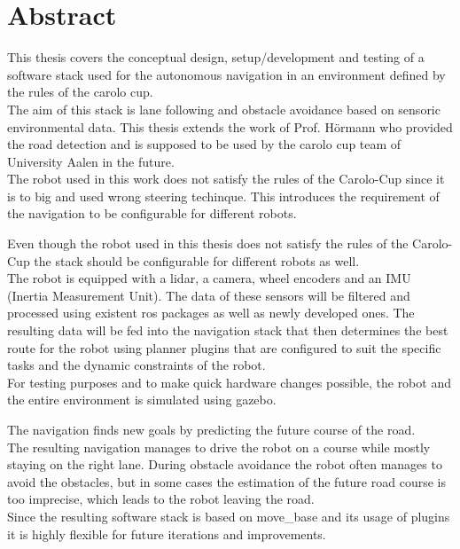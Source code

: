 \chapter*{Abstract}
\label{abstract}
This thesis covers the conceptual design, setup/development and testing of a software stack used for the autonomous navigation in an environment defined by the rules of the carolo cup.\\

 The aim of this stack is lane following and obstacle avoidance based on sensoric environmental data. This thesis extends the work of Prof. Hörmann who provided the road detection and is supposed to be used by the carolo cup team of University Aalen in the future.\\
 The robot used in this work does not satisfy the rules of the Carolo-Cup since it is to big and used wrong steering techinque. This introduces the requirement of the navigation to be configurable for different robots.
 
 Even though the robot used in this thesis does not satisfy the rules of the Carolo-Cup the stack should be configurable for different robots as well.\\
The robot is equipped with a lidar, a camera, wheel encoders and an IMU (Inertia Measurement Unit). The data of these sensors will be filtered and processed using existent ros packages as well as newly developed ones. The resulting data will be fed into the navigation stack that then determines the best route for the robot using planner plugins that are configured to suit the specific tasks and the dynamic constraints of the robot.\\

For testing purposes and to make quick hardware changes possible, the robot and the entire environment is simulated using gazebo.\\

The navigation finds new goals by predicting the future course of the road.\\

The resulting navigation manages to drive the robot on a course while mostly staying on the right lane. During obstacle avoidance the robot often manages to avoid the obstacles, but in some cases the estimation of the future road course is too imprecise, which leads to the robot leaving the road.\\

Since the resulting software stack is based on move\_base and its usage of plugins it is highly flexible for future iterations and improvements.\\
